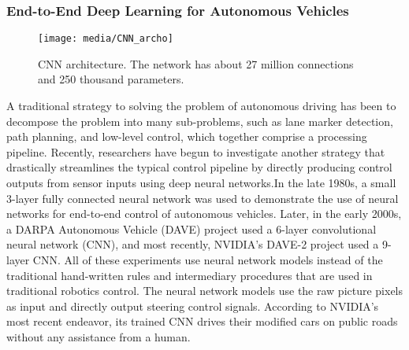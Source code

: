 \documentclass[ 12pt,a4paper,twocolumn,fleqn]{article}
\begin{document}
\subsubsection{End-to-End Deep Learning for Autonomous Vehicles}
\begin{figure}[H]
\texttt{[image: media/CNN\_archo]}
\centering
\caption{ CNN architecture. The network has about 27 million connections and 250 thousand parameters.}
\end{figure}
A traditional strategy to solving the problem of autonomous driving has been to decompose the problem into many sub-problems, such as lane marker detection, path planning, and low-level control, which together comprise a processing pipeline. Recently, researchers have begun to investigate another strategy that drastically streamlines the typical control pipeline by directly producing control outputs from sensor inputs using deep neural networks.In the late 1980s, a small 3-layer fully connected neural network was used to demonstrate the use of neural networks for end-to-end control of autonomous vehicles. Later, in the early 2000s, a DARPA Autonomous Vehicle (DAVE) project  used a 6-layer convolutional neural network (CNN), and most recently, NVIDIA's DAVE-2 project used a 9-layer CNN. All of these experiments use neural network models instead of the traditional hand-written rules and intermediary procedures that are used in traditional robotics control. The neural network models use the raw picture pixels as input and directly output steering control signals. According to NVIDIA's most recent endeavor, its trained CNN drives their modified cars on public roads without any assistance from a human.\\
\end{document}
